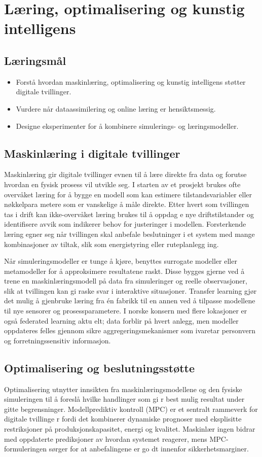 \chapter{Læring, optimalisering og kunstig intelligens}

\section{Læringsmål}
\begin{itemize}
    \item Forstå hvordan maskinlæring, optimalisering og kunstig intelligens støtter digitale tvillinger.
    \item Vurdere når dataassimilering og online læring er hensiktsmessig.
    \item Designe eksperimenter for å kombinere simulerings- og læringsmodeller.
\end{itemize}

\section{Maskinlæring i digitale tvillinger}
Maskinlæring gir digitale tvillinger evnen til å lære direkte fra data og forutse hvordan en fysisk prosess vil utvikle seg. I
starten av et prosjekt brukes ofte overvåket læring for å bygge en modell som kan estimere tilstandsvariabler eller nøkkelpara
metere som er vanskelige å måle direkte. Etter hvert som tvillingen tas i drift kan ikke-overvåket læring brukes til å oppdag
e nye driftstilstander og identifisere avvik som indikerer behov for justeringer i modellen. Forsterkende læring egner seg når
tvillingen skal anbefale beslutninger i et system med mange kombinasjoner av tiltak, slik som energistyring eller ruteplanlegg
ing. 

Når simuleringsmodeller er tunge å kjøre, benyttes surrogate modeller eller metamodeller for å approksimere resultatene raskt.
Disse bygges gjerne ved å trene en maskinlæringsmodell på data fra simuleringer og reelle observasjoner, slik at tvillingen kan
gi raske svar i interaktive situasjoner. Transfer learning gjør det mulig å gjenbruke læring fra én fabrikk til en annen ved å
tilpasse modellene til nye sensorer og prosessparametere. I norske konsern med flere lokasjoner er også federated learning aktu
elt; data forblir på hvert anlegg, men modeller oppdateres felles gjennom sikre aggregeringsmekanismer som ivaretar personvern
og forretningssensitiv informasjon.

\section{Optimalisering og beslutningsstøtte}
Optimalisering utnytter innsikten fra maskinlæringsmodellene og den fysiske simuleringen til å foreslå hvilke handlinger som gi
r best mulig resultat under gitte begrensninger. Modellprediktiv kontroll (MPC) er et sentralt rammeverk for digitale tvillinge
r fordi det kombinerer dynamiske prognoser med eksplisitte restriksjoner på produksjonskapasitet, energi og kvalitet. Maskinlær
ingen bidrar med oppdaterte prediksjoner av hvordan systemet reagerer, mens MPC-formuleringen sørger for at anbefalingene er go
dt innenfor sikkerhetsmarginer.

